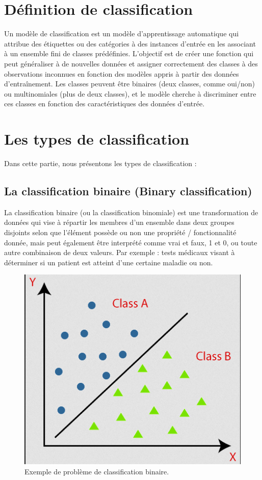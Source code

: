\section{Définition de classification }
Un modèle de classification est un modèle d'apprentissage automatique qui attribue des étiquettes ou des catégories à des instances d'entrée en les associant à un ensemble fini de classes prédéfinies. 
L'objectif est de créer une fonction qui peut généraliser à de nouvelles données et assigner correctement des classes à des observations inconnues en fonction des modèles appris à partir des données d'entraînement. 
Les classes peuvent être binaires (deux classes, comme oui/non) ou multinomiales (plus de deux classes), et le modèle cherche à discriminer entre ces classes en fonction des caractéristiques des données d'entrée.

\section{Les types de classification }
Dans cette partie, nous présentons les types de classification :
\newpage
\subsection{La classification binaire (Binary classification) }
La classification binaire (ou la classification binomiale) est une transformation de données qui vise à répartir les membres d'un ensemble dans deux groupes disjoints selon que l'élément possède ou non une propriété / fonctionnalité donnée, mais peut également être interprété comme vrai et faux, 1 et 0, ou toute autre combinaison de deux valeurs. 
Par exemple : tests médicaux visant à déterminer si un patient est atteint d'une certaine maladie ou non. 

\begin{figure}[!h]
\centering
\includegraphics[scale=0.5]{Images/Chapiter2/La classification binaire.png}
\caption{Exemple de problème de classification binaire.}
\label{fig:02}
\end{figure}

